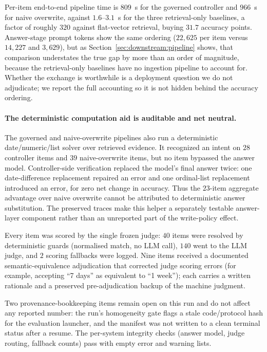 Per-item end-to-end pipeline time is $809$~s for the governed controller and
$966$~s for naive overwrite, against $1.6$--$3.1$~s for the three retrieval-only
baselines, a factor of roughly $320$ against flat-vector retrieval, buying
$31.7$ accuracy points. Answer-stage prompt tokens show the same ordering
($22{,}625$ per item versus $14{,}227$ and $3{,}629$), but as
Section~\ref{sec:downstream:pipeline} shows, that comparison understates the
true gap by more than an order of magnitude, because the retrieval-only
baselines have no ingestion pipeline to account for. Whether the exchange is
worthwhile is a deployment question we do not adjudicate; we report the full
accounting so it is not hidden behind the accuracy ordering.

\paragraph{The deterministic computation aid is auditable and net neutral.}
The governed and naive-overwrite pipelines also run a deterministic
date/numeric/list solver over retrieved evidence. It recognized an intent on
$28$ controller items and $39$ naive-overwrite items, but no item bypassed the
answer model. Controller-side verification replaced the model's final answer
twice: one date-difference replacement repaired an error and one ordinal-list
replacement introduced an error, for zero net change in accuracy. Thus the
$23$-item aggregate advantage over naive overwrite cannot be attributed to
deterministic answer substitution. The preserved traces make this helper a
separately testable answer-layer component rather than an unreported part of
the write-policy effect.

Every item was scored by the single frozen judge: $40$ items were resolved by
deterministic guards (normalised match, no LLM call), $140$ went to the LLM
judge, and $2$ scoring fallbacks were logged. Nine items received a documented
semantic-equivalence adjudication that corrected judge scoring errors (for
example, accepting ``7 days'' as equivalent to ``1 week''); each carries a
written rationale and a preserved pre-adjudication backup of the machine
judgment.

Two provenance-bookkeeping items remain open on this run and do not affect any
reported number: the run's homogeneity gate flags a stale code/protocol hash for
the evaluation launcher, and the manifest was not written to a clean terminal
status after a resume. The per-system integrity checks (answer model, judge
routing, fallback counts) pass with empty error and warning lists.


